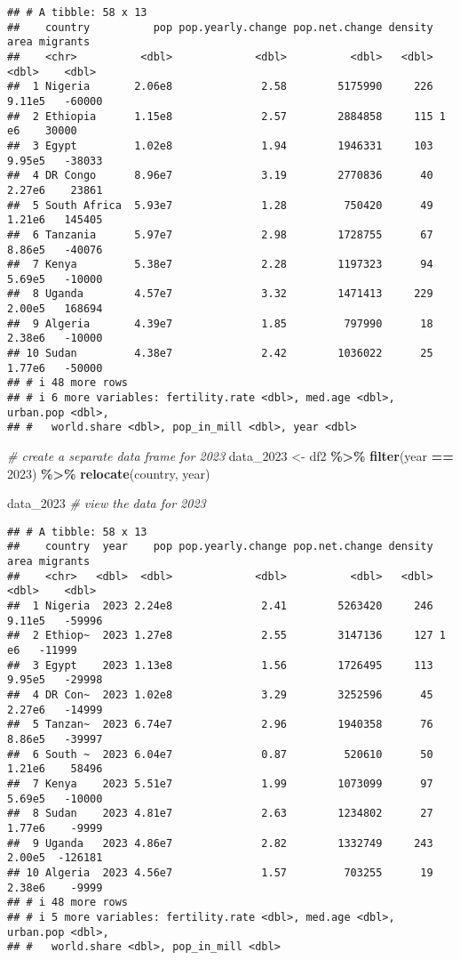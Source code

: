 \documentclass[
]{article}
\newenvironment{Shaded}{\begin{snugshade}}{\end{snugshade}}
\newcommand{\CommentTok}[1]{\textcolor[rgb]{0.56,0.35,0.01}{\textit{#1}}}
\newcommand{\DecValTok}[1]{\textcolor[rgb]{0.00,0.00,0.81}{#1}}
\newcommand{\FunctionTok}[1]{\textcolor[rgb]{0.13,0.29,0.53}{\textbf{#1}}}
\newcommand{\NormalTok}[1]{#1}
\newcommand{\OtherTok}[1]{\textcolor[rgb]{0.56,0.35,0.01}{#1}}
\newcommand{\SpecialCharTok}[1]{\textcolor[rgb]{0.81,0.36,0.00}{\textbf{#1}}}
\begin{document}
\begin{verbatim}
## # A tibble: 58 x 13
##    country          pop pop.yearly.change pop.net.change density   area migrants
##    <chr>          <dbl>             <dbl>          <dbl>   <dbl>  <dbl>    <dbl>
##  1 Nigeria       2.06e8              2.58        5175990     226 9.11e5   -60000
##  2 Ethiopia      1.15e8              2.57        2884858     115 1   e6    30000
##  3 Egypt         1.02e8              1.94        1946331     103 9.95e5   -38033
##  4 DR Congo      8.96e7              3.19        2770836      40 2.27e6    23861
##  5 South Africa  5.93e7              1.28         750420      49 1.21e6   145405
##  6 Tanzania      5.97e7              2.98        1728755      67 8.86e5   -40076
##  7 Kenya         5.38e7              2.28        1197323      94 5.69e5   -10000
##  8 Uganda        4.57e7              3.32        1471413     229 2.00e5   168694
##  9 Algeria       4.39e7              1.85         797990      18 2.38e6   -10000
## 10 Sudan         4.38e7              2.42        1036022      25 1.77e6   -50000
## # i 48 more rows
## # i 6 more variables: fertility.rate <dbl>, med.age <dbl>, urban.pop <dbl>,
## #   world.share <dbl>, pop_in_mill <dbl>, year <dbl>
\end{verbatim}

\begin{Shaded}
\begin{Highlighting}[]
\CommentTok{\# create a separate data frame for 2023}
\NormalTok{data\_2023 }\OtherTok{\textless{}{-}}\NormalTok{ df2 }\SpecialCharTok{\%\textgreater{}\%} 
  \FunctionTok{filter}\NormalTok{(year }\SpecialCharTok{==} \DecValTok{2023}\NormalTok{) }\SpecialCharTok{\%\textgreater{}\%} 
  \FunctionTok{relocate}\NormalTok{(country, year)}

\NormalTok{data\_2023 }\CommentTok{\# view the data for 2023}
\end{Highlighting}
\end{Shaded}

\begin{verbatim}
## # A tibble: 58 x 13
##    country  year    pop pop.yearly.change pop.net.change density   area migrants
##    <chr>   <dbl>  <dbl>             <dbl>          <dbl>   <dbl>  <dbl>    <dbl>
##  1 Nigeria  2023 2.24e8              2.41        5263420     246 9.11e5   -59996
##  2 Ethiop~  2023 1.27e8              2.55        3147136     127 1   e6   -11999
##  3 Egypt    2023 1.13e8              1.56        1726495     113 9.95e5   -29998
##  4 DR Con~  2023 1.02e8              3.29        3252596      45 2.27e6   -14999
##  5 Tanzan~  2023 6.74e7              2.96        1940358      76 8.86e5   -39997
##  6 South ~  2023 6.04e7              0.87         520610      50 1.21e6    58496
##  7 Kenya    2023 5.51e7              1.99        1073099      97 5.69e5   -10000
##  8 Sudan    2023 4.81e7              2.63        1234802      27 1.77e6    -9999
##  9 Uganda   2023 4.86e7              2.82        1332749     243 2.00e5  -126181
## 10 Algeria  2023 4.56e7              1.57         703255      19 2.38e6    -9999
## # i 48 more rows
## # i 5 more variables: fertility.rate <dbl>, med.age <dbl>, urban.pop <dbl>,
## #   world.share <dbl>, pop_in_mill <dbl>
\end{verbatim}
\end{document}
